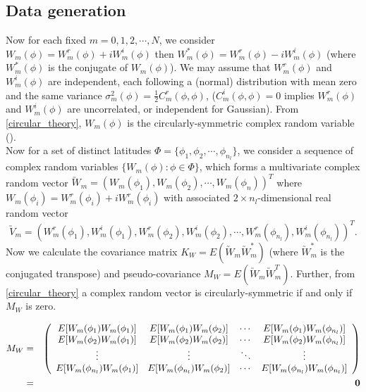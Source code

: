 	\subsection{Data generation}
	
	Now for each fixed $m = 0, 1, 2, \cdots, N$, we consider  $W_m(\phi) = W_m^r(\phi) + i W_m^i(\phi)$ then $W_m^*(\phi) = W_m^r(\phi) - i W_m^i(\phi)$ (where $W_m^*(\phi)$ is the conjugate of $W_m(\phi)$). We may assume that $W_m^r(\phi)$ and $W_m^i(\phi)$ are independent, each following a (normal) distribution with mean zero and the same variance $\sigma_m^2(\phi) = \frac{1}{2}C_m^r(\phi, \phi)$, ($C_m^i(\phi, \phi) = 0$ implies $W_m^r(\phi)$ and $W_m^i(\phi)$ are uncorrelated, or independent for Gaussian). From \ref{circular_theory}, $W_m(\phi)$ is the circularly-symmetric complex random variable (\cite{Gallager2008}).  \\
	
	Now for a set of distinct latitudes $\Phi = \{\phi_1, \phi_2, \cdots, \phi_{n_l}\}$, we consider a sequence of complex random variables $\{W_m(\phi): \phi \in \Phi\}$, which forms a multivariate complex random vector $\utilde{W}_m = (W_m(\phi_1), W_m(\phi_2), \cdots, W_m(\phi_n))^T$ where $W_m(\phi_i) = W_m^r(\phi_i) + iW_m^r(\phi_i)$ with associated $2\times n_l$-dimensional real random vector
	$$\utilde{V}_m = (W_m^r(\phi_1), W_m^i(\phi_1),W_m^r(\phi_2), W_m^i(\phi_2),\cdots, W_m^r(\phi_{n_l}), W_m^i(\phi_{n_l}))^T.$$
	Now we calculate the covariance matrix $K_W = E(\utilde{W}_m\utilde{W}_m^*)$ (where $\utilde{W}_m^*$ is the conjugated transpose) and pseudo-covariance $M_W = E(\utilde{W}_m\utilde{W}_m^T)$. Further, from \ref{circular_theory} a complex random vector is circularly-symmetric if and only if $M_W$ is zero.
	
	\begin{eqnarray*}
		M_W & = & \left(\begin{array}{cccc}
		E[W_m(\phi_1) W_m(\phi_1) ] & E[W_m(\phi_1) W_m(\phi_2) ]  & \cdots & E[W_m(\phi_1) W_m(\phi_{n_l}) ]\\
		E[W_m(\phi_2) W_m(\phi_1) ] & E[W_m(\phi_2) W_m(\phi_2) ]  & \cdots & E[W_m(\phi_2) W_m(\phi_{n_l}) ]\\
		\vdots & \vdots  & \ddots & \vdots \\
		E[W_m(\phi_{n_l}) W_m(\phi_1) ] & E[W_m(\phi_{n_l}) W_m(\phi_2) ]  & \cdots & E[W_m(\phi_{n_l}) W_m(\phi_{n_l})]
		\end{array}
		\right)\\
		&=& {\bf 0}
	\end{eqnarray*}
	
